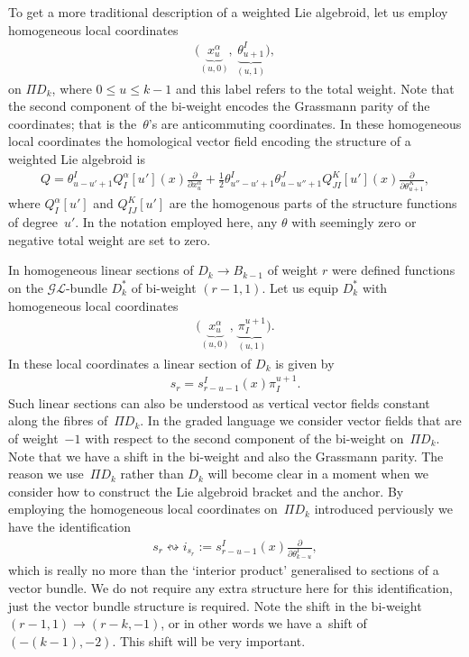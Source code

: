 \documentclass[10pt,a4paper]{amsart}
\numberwithin{equation}{section}
\begin{document}
To get a more traditional description of a weighted Lie algebroid, let us employ homogeneous local coordinates
\begin{gather*}
\big(\underbrace{x^{\alpha}_{u}}_{(u,0)}, \, \underbrace{\theta^{I}_{u+1}}_{(u,1)}\big),
\end{gather*}
on $\Pi D_{k}$, where  $0 \leq u \leq k-1$ and this label refers to the total weight. Note that the second component of the bi-weight encodes the Grassmann parity of the coordinates; that is the~$\theta$'s are anticommuting coordinates. In these homogeneous local coordinates the homological vector f\/ield encoding the structure of a weighted Lie algebroid is
\begin{gather*}
Q = \theta^{I}_{u-u'+1}Q_{I}^{\alpha}[u'](x) \frac{\partial}{\partial x^{\alpha}_{u} }  + \frac{1}{2} \theta^{I}_{u''-u'+1} \theta^{J}_{u-u''+1}Q_{JI}^{K}[u'](x)\frac{\partial}{\partial \theta_{u+1}^{K} } ,
\end{gather*}
 where $Q_{I}^{\alpha}[u']$ and $Q_{IJ}^{K}[u']$ are the homogenous parts of the structure functions of degree~$u'$. In the notation employed here, any  $\theta$ with seemingly zero or negative total weight  are set to zero.

In \cite{Bruce:2014} homogeneous  linear sections of $D_{k} \rightarrow B_{k-1}$ of weight $r$ were def\/ined functions on the $\mathcal{GL}$-bundle  $D_{k}^{*}$ of bi-weight $(r-1, 1)$. Let us equip $D_{k}^{*}$ with homogeneous local coordinates
\begin{gather*}
\big(\underbrace{x^{\alpha}_{u}}_{(u,0)}, \, \underbrace{\pi_{I}^{u+1}}_{(u,1)}\big).
\end{gather*}
  In these local coordinates a linear section of $D_{k}$ is given by
\begin{gather*}
s_{r}= s_{r-u-1}^{I}(x)\pi_{I}^{u+1}.
\end{gather*}
 Such linear  sections can also be understood as vertical vector f\/ields constant along the f\/ibres  of~$\Pi D_{k}$. In the graded language we consider vector f\/ields that are of weight~$-1$ with respect to the second component of the bi-weight on~$\Pi D_{k}$.  Note that we have a shift in the bi-weight and also the Grassmann parity.  The reason we use~$\Pi D_{k}$ rather than $D_{k}$ will become clear in a moment when we consider how to construct the Lie algebroid bracket and the anchor. By employing  the homogeneous local coordinates on~$\Pi D_{k}$ introduced perviously we have the identif\/ication
\begin{gather*}
s_{r} \leftrightsquigarrow i_{s_{r}}:= s^{I}_{r-u-1}(x)\frac{\partial}{\partial \theta_{k-u}^{I}} ,
\end{gather*}
 which is really no more than the `interior product' generalised to sections of a vector bundle. We do not require any extra structure here for this identif\/ication, just the vector bundle structure is required. Note the shift in the bi-weight $(r-1,1)\rightarrow (r-k,-1)$, or in other words we have a~shift  of $(-(k-1), -2)$. This shift will be very important.
\end{document}
